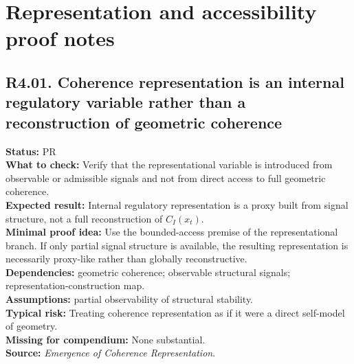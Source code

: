 \documentclass[12pt]{article}
\begin{document}
	\section{Representation and accessibility proof notes}
	
	\subsection*{R4.01. Coherence representation is an internal regulatory variable rather than a reconstruction of geometric coherence}
	\textbf{Status:} PR \\
	\textbf{What to check:} Verify that the representational variable is introduced from observable or admissible signals and not from direct access to full geometric coherence. \\
	\textbf{Expected result:} Internal regulatory representation is a proxy built from signal structure, not a full reconstruction of $C_I(x_t)$. \\
	\textbf{Minimal proof idea:} Use the bounded-access premise of the representational branch. If only partial signal structure is available, the resulting representation is necessarily proxy-like rather than globally reconstructive. \\
	\textbf{Dependencies:} geometric coherence; observable structural signals; representation-construction map. \\
	\textbf{Assumptions:} partial observability of structural stability. \\
	\textbf{Typical risk:} Treating coherence representation as if it were a direct self-model of geometry. \\
	\textbf{Missing for compendium:} None substantial. \\
	\textbf{Source:} \emph{Emergence of Coherence Representation}.
	
\end{document}
